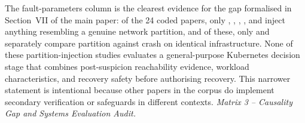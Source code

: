 \documentclass[10pt]{article}
\begin{document}
The fault-parameters column is the clearest evidence for the gap
formalised in Section~VII of the main paper: of the 24 coded papers, only
\cite{chen2026empirical}, \cite{chen2026distributed}, \cite{jerrari2026ha},
\cite{jin2026replicationfree}, and \cite{jensen2021raft} inject
anything resembling a genuine network partition, and of these, only
\cite{jerrari2026ha} and \cite{jensen2021raft} separately compare
partition against crash on identical infrastructure. None of these partition-injection studies evaluates a general-purpose Kubernetes decision stage that combines post-suspicion reachability evidence, workload characteristics, and recovery safety before authorising recovery. This narrower statement is intentional because other papers in the corpus do implement secondary verification or safeguards in different contexts.
\medskip\noindent\textit{Matrix 3 -- Causality Gap and Systems Evaluation Audit.}\par\smallskip
\end{document}
